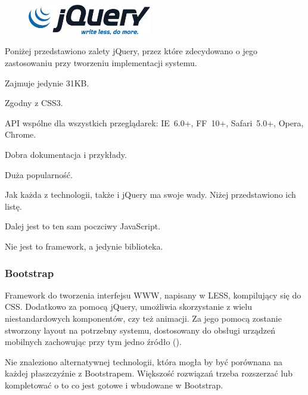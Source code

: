 \begin{figure}
  \begin{center}
    \includegraphics[width=0.48\textwidth]{img/logos/jquery.jpg}
  \end{center}
\end{figure}

Poniżej przedstawiono zalety jQuery, przez które zdecydowano o jego zastosowaniu przy tworzeniu implementacji systemu.
\begin{packed_item}
    \item{Zajmuje jedynie 31KB.}
    \item{Zgodny z CSS3.}
    \item{API wspólne dla wszystkich przeglądarek: IE~6.0+, FF~10+, Safari~5.0+, Opera, Chrome.}
    \item{Dobra dokumentacja i przykłady.}
    \item{Duża popularność.}
\end{packed_item}

Jak każda z technologii, także i jQuery ma swoje wady. Niżej przedstawiono ich listę.
\begin{packed_item}
    \item{Dalej jest to ten sam poczciwy JavaScript.}
    \item{Nie jest to framework, a jedynie biblioteka.}
\end{packed_item}

\newpage
\subsubsection{Bootstrap}
Framework do tworzenia interfejsu WWW, napisany w LESS, kompilujący się do CSS. Dodatkowo za pomocą jQuery, umożliwia skorzystanie z wielu niestandardowych komponentów, czy też animacji. Za jego pomocą zostanie stworzony layout na potrzebny systemu, dostosowany do obsługi urządzeń mobilnych zachowując przy tym jedno źródło (\cite{bootstrap}).

Nie znaleziono alternatywnej technologii, która mogła by być porównana na każdej płaszczyźnie z Bootstrapem. Większość rozwiązań trzeba rozszerzać lub kompletować o to co jest gotowe i wbudowane w Bootstrap.

